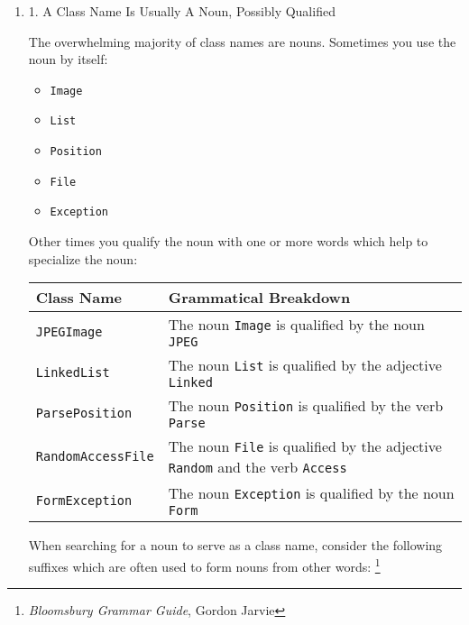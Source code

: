 \documentclass{article}
\begin{document}
\begin{enumerate}
\item 1. A Class Name Is Usually A Noun, Possibly Qualified
\label{sec:orgheadline264}

The overwhelming majority of class names are nouns. Sometimes you use
the noun by itself:

\begin{itemize}
\item \texttt{Image}
\item \texttt{List}
\item \texttt{Position}
\item \texttt{File}
\item \texttt{Exception}
\end{itemize}

Other times you qualify the noun with one or more words which help to
specialize the noun:

\begin{center}
\begin{tabular}{ll}
Class Name & Grammatical Breakdown\\
\hline
\texttt{JPEGImage} & The noun \texttt{Image} is qualified by the noun \texttt{JPEG}\\
\texttt{LinkedList} & The noun \texttt{List} is qualified by the adjective \texttt{Linked}\\
\texttt{ParsePosition} & The noun \texttt{Position} is qualified by the verb \texttt{Parse}\\
\texttt{RandomAccessFile} & The noun \texttt{File} is qualified by the adjective \texttt{Random} and the verb \texttt{Access}\\
\texttt{FormException} & The noun \texttt{Exception} is qualified by the noun \texttt{Form}\\
\end{tabular}
\end{center}

When searching for a noun to serve as a class name, consider the
following suffixes which are often used to form nouns from other
words: \footnote{\emph{Bloomsbury Grammar Guide}, Gordon Jarvie}


\end{enumerate}
\end{document}
